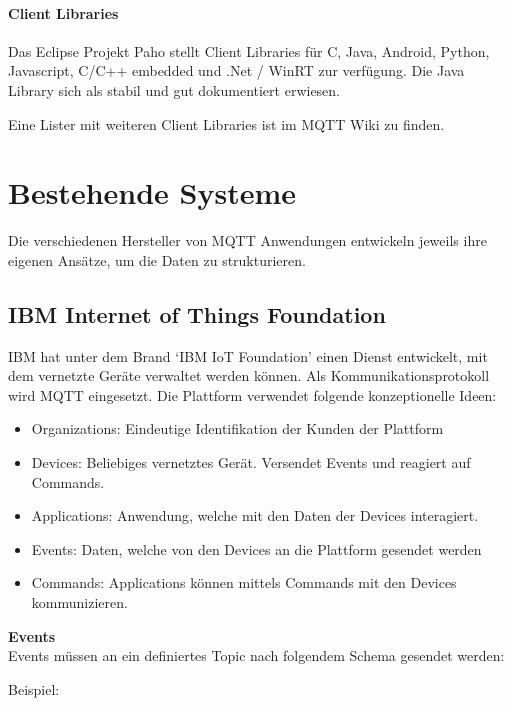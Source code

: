 \paragraph{Client Libraries}

Das Eclipse Projekt Paho \cite{paho} stellt Client Libraries für C, Java, Android, Python,
 Javascript, C/C++ embedded und .Net / WinRT zur verfügung. Die Java Library sich als stabil und gut dokumentiert erwiesen.

Eine Lister mit weiteren Client Libraries ist im MQTT Wiki \cite{clientLibs} zu finden.



\section{Bestehende Systeme}
Die verschiedenen Hersteller von MQTT Anwendungen entwickeln jeweils ihre eigenen Ansätze, um die Daten zu strukturieren. 


\subsection{IBM Internet of Things Foundation}

IBM hat unter dem Brand `IBM IoT Foundation' \cite{ibmIotF:home} einen Dienst entwickelt, mit dem vernetzte Geräte verwaltet werden können. Als Kommunikationsprotokoll wird MQTT eingesetzt. Die Plattform verwendet folgende konzeptionelle Ideen:
\begin{itemize}
    \item Organizations: Eindeutige Identifikation der Kunden der Plattform
	\item Devices: Beliebiges vernetztes Gerät. Versendet Events und reagiert auf Commands.
	\item Applications: Anwendung, welche mit den Daten der Devices interagiert.
	\item Events: Daten, welche von den Devices an die Plattform gesendet werden
	\item Commands: Applications können mittels Commands mit den Devices kommunizieren.
\end{itemize}

\textbf{Events} \\
Events müssen an ein definiertes Topic nach folgendem Schema gesendet werden: \\

Beispiel: 

